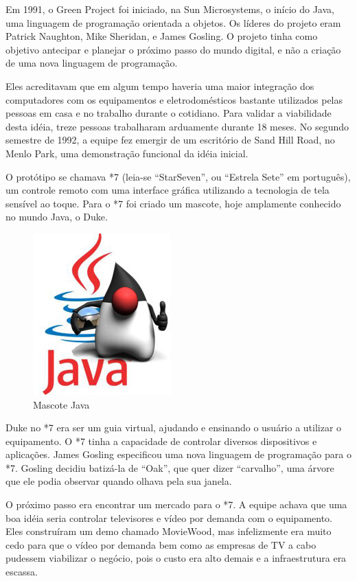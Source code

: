 \documentclass[
	12pt,				%
	openright,			%
	oneside,			%
	a4paper,			%
	english,			%
	french,				%
	spanish,			%
	brazil				%
	]{abntex2}
\begin{document}
Em 1991, o Green Project foi iniciado, na Sun Microsystems, o início do Java,
uma linguagem de programação orientada a objetos. Os líderes do
projeto eram Patrick Naughton, Mike Sheridan, e James Gosling. O projeto tinha como objetivo antecipar e planejar o próximo passo do mundo digital, e não a criação de uma nova linguagem de programação.

Eles acreditavam que em algum tempo haveria uma maior integração dos computadores com os equipamentos e eletrodomésticos bastante utilizados pelas pessoas em casa e no trabalho durante o cotidiano. Para validar a viabilidade desta idéia, treze pessoas trabalharam arduamente durante 18 meses. No segundo semestre de 1992, a equipe fez emergir de um escritório de Sand Hill Road, no Menlo Park, uma demonstração funcional da idéia inicial. 

O protótipo se chamava *7 (leia-se “StarSeven”, ou “Estrela Sete” em português), um
controle remoto com uma interface gráfica utilizando a tecnologia de tela sensível ao toque. Para o *7 foi criado um mascote, hoje amplamente conhecido no mundo Java, o Duke.

\begin{figure}[!h]
\centering
  \includegraphics[width=0.3\linewidth]{Java-duke.jpg}
  \caption{Mascote Java}
  \label{fig:Mascote Java}
\end{figure}


Duke no *7 era ser um guia virtual, ajudando e ensinando o usuário a utilizar o equipamento. O *7 tinha a capacidade de controlar diversos dispositivos e aplicações. James Gosling especificou uma nova linguagem de programação para o *7. Gosling decidiu batizá-la de “Oak”, que quer dizer “carvalho”, uma árvore que ele podia observar quando olhava pela sua janela. 

O próximo passo era encontrar um mercado para o *7. A equipe achava que uma boa idéia seria controlar televisores e vídeo por demanda com o equipamento. Eles construíram um demo chamado MovieWood, mas infelizmente era muito cedo para que o vídeo por demanda bem como as empresas de TV a cabo pudessem viabilizar o negócio, pois o custo era alto demais e a infraestrutura era escassa. 
\end{document}
